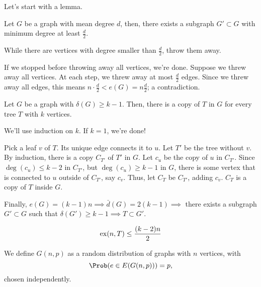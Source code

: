 \begin{dem} Let's start with a lemma.
	\begin{lem}
		Let $G$ be a graph with mean degree $d$, then, there exists a subgraph $G' \subset G$ with minimum degree at least $\frac{d}{2}$.
	\end{lem}
	\begin{dem}
		While there are vertices with degree smaller than $\frac{d}{2}$, throw them away.

		If we stopped before throwing away all vertices, we're done. Suppose we threw away all vertices. At each step, we threw away at most $\frac{d}{2}$ edges. Since we threw away all edges, this means $n \cdot \frac{d}{2} < e(G) = n\frac{d}{2}$; a contradiction.
	\end{dem}

	\begin{lem}
		Let $G$ be a graph with $\delta(G) \ge k - 1$. Then, there is a copy of $T$ in $G$ for every tree $T$ with $k$ vertices.
	\end{lem}

	\begin{dem}
		We'll use induction on $k$. If $k = 1$, we're done!

		Pick a leaf $v$ of $T$. Its unique edge connects it to $u$. Let $T'$ be the tree without $v$. By induction, there is a copy $C_{T'}$ of $T'$ in $G$. Let $c_u$ be the copy of  $u$ in $C_{T'}$. Since $\deg(c_u) \le k - 2$ in $C_{T'}$, but $\deg(c_u) \ge k-1$ in $G$, there is some vertex that is connected to $u$ outside of $C_{T'}$, say $c_v$. Thus, let $C_{T}$ be $C_{T'}$, adding $c_v$. $C_{T}$ is a copy of $T$ inside $G$.
	\end{dem}

	Finally, $e(G) = (k-1)n \implies \bar{d}(G) = 2(k-1) \implies$ there exists a subgraph $G' \subset G$ such that $\delta(G') \ge k - 1 \implies T \subset G'$.
\end{dem}

\begin{conj}
	\[
		\operatorname{ex}(n, T) \le \frac{(k-2)n}{2}
	\]
\end{conj}

\begin{defn}\label{defn:randomgraph}
	We define $G(n, p)$ as a random distribution of graphs with $n$ vertices, with \[
		\Prob(e \in E(G(n, p))) = p,
	\] chosen independently.
\end{defn}


